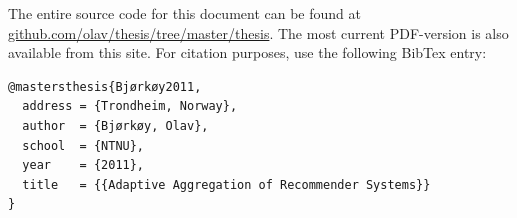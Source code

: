 The entire source code for this document can be found at 
\url{github.com/olav/thesis/tree/master/thesis}.
The most current PDF-version is also available from this site.
For citation purposes, use the following BibTex entry:

{
\footnotesize
\begin{verbatim}
@mastersthesis{Bjørkøy2011,
  address = {Trondheim, Norway},
  author  = {Bjørkøy, Olav},
  school  = {NTNU},
  year    = {2011},
  title   = {{Adaptive Aggregation of Recommender Systems}}
} 
\end{verbatim}
}

